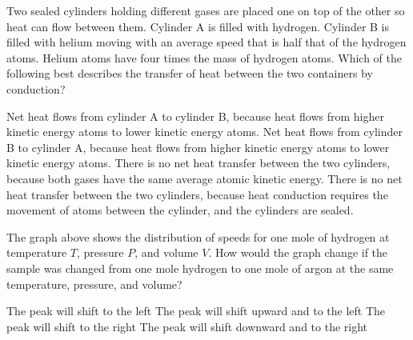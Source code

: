 \documentclass{../../oss-apphys-exam}
\begin{document}
\begin{questions}
  
  \question Two sealed cylinders holding different gases are placed one on top
  of the other so heat can flow between them. Cylinder A is filled with
  hydrogen. Cylinder B is filled with helium moving with an average speed that
  is half that of the hydrogen atoms. Helium atoms have four times the mass of
  hydrogen atoms. Which of the following best describes the transfer of heat
  between the two containers by conduction?
  \begin{choices}
    \choice Net heat flows from cylinder A to cylinder B, because heat flows
    from higher kinetic energy atoms to lower kinetic energy atoms.
    \choice Net heat flows from cylinder B to cylinder A, because heat flows
    from higher kinetic energy atoms to lower kinetic energy atoms.
    \choice There is no net heat transfer between the two cylinders, because
    both gases have the same average atomic kinetic energy.
    \choice There is no net heat transfer between the two cylinders, because
    heat conduction requires the movement of atoms between the cylinder, and the
    cylinders are sealed.
  \end{choices}

  \question The graph above shows the distribution of speeds for one mole of
  hydrogen at temperature $T$, pressure $P$, and volume $V$. How would the
  graph change if the sample was changed from one mole hydrogen to one mole of
  argon at the same temperature, pressure, and volume?
  \begin{choices}
    \choice The peak will shift to the left
    \choice The peak will shift upward and to the left
    \choice The peak will shift to the right
    \choice The peak will shift downward and to the right
  \end{choices}
  \newpage
  

\end{questions}
\end{document}
